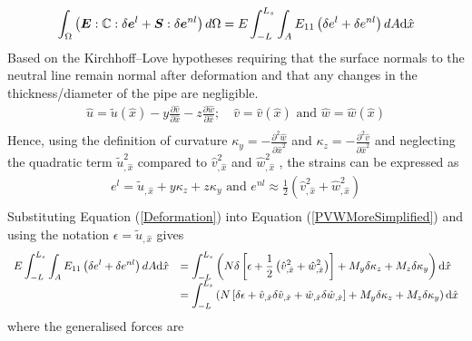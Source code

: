 \documentclass[3p,doublespacing,authoryear,11pt]{elsarticle} %
\begin{document}
  \begin{equation}\label{PVWMoreSimplified}
  \begin{array}{l } 
\displaystyle \int_{\Omega} \left(\boldsymbol{E}: \mathbb{C}:  \delta \boldsymbol{e}^{l}  + \boldsymbol{S}: \delta \boldsymbol{e}^{nl}  \right)  d\Omega  =  
\displaystyle E \int_{-L}^{L_s} \int_{A} E_{11}\left(\delta e^{l} + \delta e^{nl} \right) dA \textup{d}\hat{x} \\
  \end{array}  
 \end{equation}
 Based on the Kirchhoff--Love hypotheses requiring that the surface normals to the neutral line remain normal after deformation and that any changes in the thickness/diameter of the pipe are negligible.
 \begin{equation}\label{Displacement}
\begin{array}{l }
\hat{u} = \tilde{u} (\hat{x}) - y \frac{\partial \hat{v}}{\partial \hat{x}} - z \frac{\partial \hat{w}}{\partial \hat{x}}; \quad \hat{v} = \hat{v} (\hat{x}) \text{ and } \hat{w} = \hat{w} (\hat{x}) \\
  \end{array}  
\end{equation}
Hence, using the definition of curvature $\kappa_y = -\frac{\partial^2 \hat{w}}{\partial \hat{x}^2}$ and $\kappa_z = -\frac{\partial^2 \hat{v}}{\partial \hat{x}^2}$ and neglecting the quadratic term $\tilde{u}_{,\hat{x}} ^2$ compared to $\hat{v}_{,\hat{x}}^2$ and $\hat{w}_{,\hat{x}}^2$ , the strains can be expressed as 
 \begin{equation}\label{Deformation}
\begin{array}{l }
e^{l}  =   \tilde{u}_{,\hat{x}} + y \kappa_z + z \kappa_y  \text{ and } e^{nl} \approx  \frac{1}{2} \left( \hat{v}_{,\hat{x}}^2 + \hat{w}_{,\hat{x}}^2 \right)  \\
  \end{array}  
\end{equation}
Substituting Equation (\ref{Deformation}) into Equation (\ref{PVWMoreSimplified}) and using the notation $\epsilon= \tilde{u}_{,\hat{x}} $ gives
  \begin{equation}\label{PVWMoreSimplified_bis}
  \begin{array}{l l} 
\displaystyle E \int_{-L}^{L_s} \int_{A} E_{11}\left(\delta e^{l} + \delta e^{nl} \right) dA \textup{d} \hat{x}  &  \displaystyle = \int_{-L}^{L_s} \left( N \delta \left[\epsilon + \frac{1}{2} \left(\hat{v}_{,\hat{x}}^2 + \hat{w}_{,\hat{x}}^2 \right) \right]+ M_y \delta \kappa_z + M_z \delta \kappa_y \right) \textup{d} \hat{x}\\
& \displaystyle = \int_{-L}^{L_s} \left( N \left[ \delta \epsilon + \hat{v}_{,\hat{x}}  \delta \hat{v}_{,\hat{x}}  + \hat{w}_{,\hat{x}}  \delta \hat{w}_{,\hat{x}}   \right]+ M_y \delta \kappa_z + M_z \delta \kappa_y \right) \textup{d}\hat{x}
  \end{array}  
 \end{equation}
 where the generalised forces are
 
\end{document}
